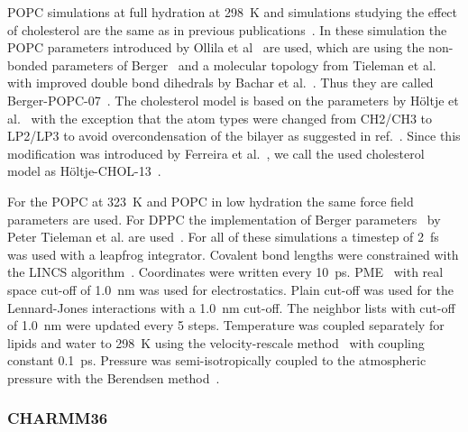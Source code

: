 \documentclass[journal=jacsat,manuscript=article]{achemso}
\begin{document}
POPC simulations at full hydration at 298~K and simulations studying the effect of cholesterol are the same as in previous publications~\cite{ferreira13,ferreira15}.
In these simulation the POPC parameters introduced by Ollila et al~\cite{ollila07a} are used, which are using the non-bonded parameters of Berger~\cite{berger97}
and a molecular topology from Tieleman et al.~\cite{tieleman99} with improved double bond dihedrals by Bachar et al.~\cite{bachar04}. 
Thus they are called Berger-POPC-07~\cite{ollila07a}. The cholesterol model is based on the parameters by H\"oltje et al.~\cite{holtje01} with the
exception that the atom types were changed from CH2/CH3 to LP2/LP3 to avoid overcondensation of the bilayer as suggested in ref.~\cite{tieleman06}.
Since this modification was introduced by Ferreira et al.~\cite{ferreira13}, we call the used cholesterol model as H\"oltje-CHOL-13~\cite{ferreira13}.

For the POPC at 323~K and POPC in low hydration the same force field parameters are used.
For DPPC the implementation of Berger parameters~\cite{berger97} by Peter Tieleman et al. are used~\cite{marrink98}.
For all of these simulations a timestep of 2~fs was used with a leapfrog integrator. Covalent bond lengths were constrained with the LINCS algorithm~\cite{hess97,hess07}. 
Coordinates were written every 10~ps. PME~\cite{darden93,essman95} with real space cut-off of 1.0~nm was used 
for electrostatics. Plain cut-off was used for the Lennard-Jones interactions with a 1.0~nm cut-off.
The neighbor lists with cut-off of 1.0~nm were updated every 5 steps. Temperature was coupled separately
for lipids and water to 298~K using the velocity-rescale method~\cite{bussi07} with coupling constant 0.1~ps.
Pressure was semi-isotropically coupled to the atmospheric pressure with the Berendsen method~\cite{berendsen84}.

\subsubsection{CHARMM36}
\end{document}
